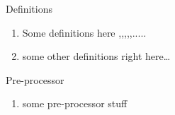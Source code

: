 \begin{frame}{Definitions}
\begin{enumerate}
\item Some definitions here ,,,,,.....
\item some other definitions right here\ldots
\end{enumerate}
\end{frame}

\begin{frame}{Pre-processor}
\begin{enumerate}
\item some pre-processor stuff  
\end{enumerate}
\end{frame}
